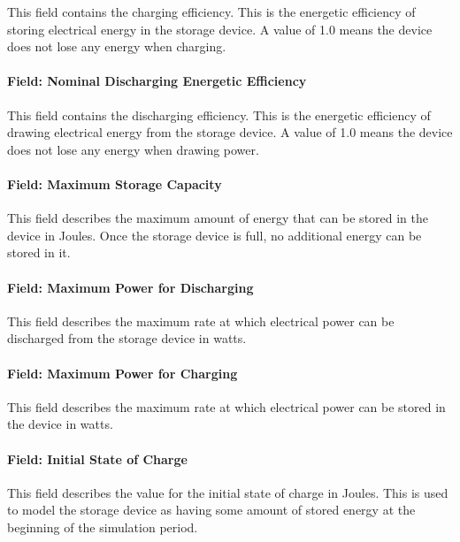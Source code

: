 This field contains the charging efficiency. This is the energetic efficiency of storing electrical energy in the storage device. A value of 1.0 means the device does not lose any energy when charging.

\paragraph{Field: Nominal Discharging Energetic Efficiency}\label{field-nominal-discharging-energetic-efficiency}

This field contains the discharging efficiency. This is the energetic efficiency of drawing electrical energy from the storage device. A value of 1.0 means the device does not lose any energy when drawing power.

\paragraph{Field: Maximum Storage Capacity}\label{field-maximum-storage-capacity}

This field describes the maximum amount of energy that can be stored in the device in Joules. Once the storage device is full, no additional energy can be stored in it.

\paragraph{Field: Maximum Power for Discharging}\label{field-maximum-power-for-discharging}

This field describes the maximum rate at which electrical power can be discharged from the storage device in watts.

\paragraph{Field: Maximum Power for Charging}\label{field-maximum-power-for-charging}

This field describes the maximum rate at which electrical power can be stored in the device in watts.

\paragraph{Field: Initial State of Charge}\label{field-initial-state-of-charge}

This field describes the value for the initial state of charge in Joules. This is used to model the storage device as having some amount of stored energy at the beginning of the simulation period.

